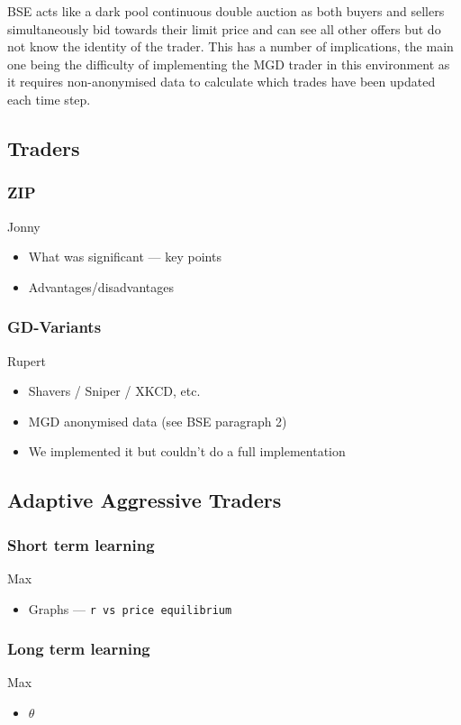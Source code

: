 \documentclass[12pt]{article} %
\begin{document}
BSE acts like a dark pool continuous double auction as both buyers and sellers simultaneously bid 
towards their limit price and can see all other offers but do not know the identity of the trader. 
This has a number of implications, the main one being the difficulty of implementing the MGD trader 
in this environment as it requires non-anonymised data to calculate which trades have been updated 
each time step.

\subsection{Traders}
\subsubsection{ZIP}
Jonny
\begin{itemize} \itemsep0pt
	\item What was significant --- key points
	\item Advantages/disadvantages
\end{itemize}

\subsubsection{GD-Variants}
Rupert
\begin{itemize} \itemsep0pt
	\item Shavers / Sniper / XKCD, etc.
	\item MGD anonymised data (see BSE paragraph 2)
	\item We implemented it but couldn't do a full implementation
\end{itemize}

\subsection{Adaptive Aggressive Traders}
\subsubsection{Short term learning}
Max
\begin{itemize} \itemsep0pt
	\item Graphs --- \tt r \rm vs price equilibrium
\end{itemize}

\subsubsection{Long term learning}
Max
\begin{itemize} \itemsep0pt
	\item $\theta$
\end{itemize}
\end{document}
